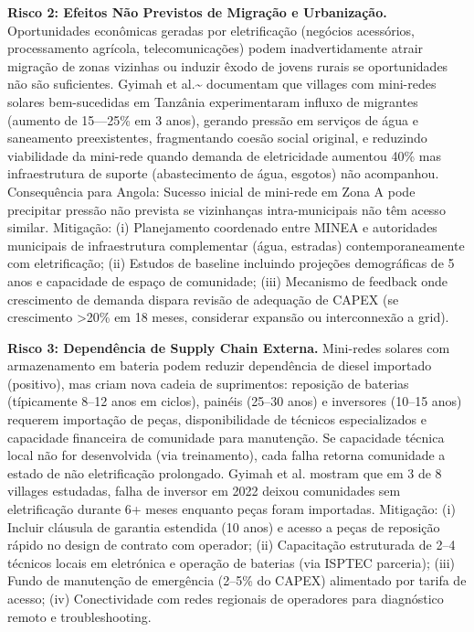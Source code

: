 \documentclass[12pt, a4paper]{article}
\begin{document}
\textbf{Risco 2: Efeitos Não Previstos de Migração e Urbanização.} Oportunidades econômicas geradas por eletrificação (negócios acessórios, processamento agrícola, telecomunicações) podem inadvertidamente atrair migração de zonas vizinhas ou induzir êxodo de jovens rurais se oportunidades não são suficientes. Gyimah et al.\textasciitilde{}\citep{Gyimah2024} documentam que villages com mini-redes solares bem-sucedidas em Tanzânia experimentaram influxo de migrantes (aumento de 15—25\% em 3 anos), gerando pressão em serviços de água e saneamento preexistentes, fragmentando coesão social original, e reduzindo viabilidade da mini-rede quando demanda de eletricidade aumentou 40\% mas infraestrutura de suporte (abastecimento de água, esgotos) não acompanhou. Consequência para Angola: Sucesso inicial de mini-rede em Zona A pode precipitar pressão não prevista se vizinhanças intra-municipais não têm acesso similar. Mitigação: (i) Planejamento coordenado entre MINEA e autoridades municipais de infraestrutura complementar (água, estradas) contemporaneamente com eletrificação; (ii) Estudos de baseline incluindo projeções demográficas de 5 anos e capacidade de espaço de comunidade; (iii) Mecanismo de feedback onde crescimento de demanda dispara revisão de adequação de CAPEX (se crescimento >20\% em 18 meses, considerar expansão ou interconnexão a grid).

\textbf{Risco 3: Dependência de Supply Chain Externa.} Mini-redes solares com armazenamento em bateria podem reduzir dependência de diesel importado (positivo), mas criam nova cadeia de suprimentos: reposição de baterias (típicamente 8--12 anos em ciclos), painéis (25--30 anos) e inversores (10--15 anos) requerem importação de peças, disponibilidade de técnicos especializados e capacidade financeira de comunidade para manutenção. Se capacidade técnica local não for desenvolvida (via treinamento), cada falha retorna comunidade a estado de não eletrificação prolongado. Gyimah et al. mostram que em 3 de 8 villages estudadas, falha de inversor em 2022 deixou comunidades sem eletrificação durante 6+ meses enquanto peças foram importadas. Mitigação: (i) Incluir cláusula de garantia estendida (10 anos) e acesso a peças de reposição rápido no design de contrato com operador; (ii) Capacitação estruturada de 2--4 técnicos locais em eletrónica e operação de baterias (via ISPTEC parceria); (iii) Fundo de manutenção de emergência (2--5\% do CAPEX) alimentado por tarifa de acesso; (iv) Conectividade com redes regionais de operadores para diagnóstico remoto e troubleshooting.
\end{document}
